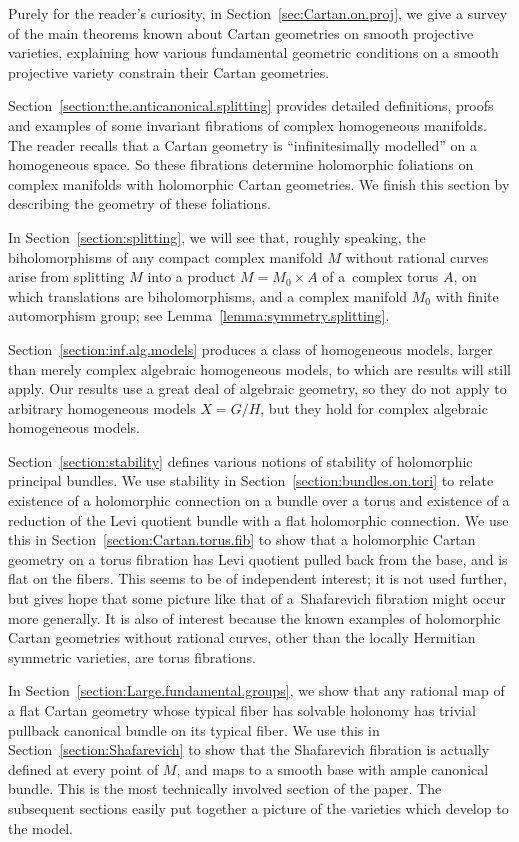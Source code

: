 \documentclass[10pt,a4paper]{amsart}
\numberwithin{equation}{section}
\begin{document}
Purely for the reader's curiosity, in Section~\ref{sec:Cartan.on.proj}, we give a survey of the main theorems known about Cartan
geometries on smooth projective varieties, explaining how various fundamental geometric conditions on a smooth projective variety
constrain their Cartan geometries.

Section~\ref{section:the.anticanonical.splitting} provides detailed definitions, proofs and examples of some invariant fibrations of complex homogeneous manifolds.
The reader recalls that a Cartan geometry is ``infinitesimally modelled'' on a homogeneous space.
So these fibrations determine holomorphic foliations on complex manifolds with holomorphic Cartan geometries.
We finish this section by describing the geometry of these foliations.

In Section~\ref{section:splitting}, we will see that, roughly speaking, the biholomorphisms of any compact complex manifold $M$ without rational curves arise from splitting $M$
into a product $M = M_0\times A$ of a~complex torus $A$, on which translations are biholomorphisms, and a complex manifold $M_0$ with
finite automorphism group; see Lemma~\ref{lemma:symmetry.splitting}.

Section~\ref{section:inf.alg.models} produces a class of homogeneous models, larger than merely complex algebraic homogeneous models, to which are results will still apply.
Our results use a great deal of algebraic geometry, so they do not apply to arbitrary homogeneous models $X = G/H$, but they hold for complex algebraic homogeneous models.

Section~\ref{section:stability} defines various notions of stability of holomorphic principal bundles.
We use stability in Section~\ref{section:bundles.on.tori} to relate existence of a holomorphic connection on a bundle over a torus and existence of a reduction of the Levi quotient bundle with a flat holomorphic connection.
We use this in Section~\ref{section:Cartan.torus.fib} to show that a holomorphic Cartan geometry on a torus fibration has Levi quotient pulled back from the base, and is flat on the fibers.
This seems to be of independent interest; it is not used further, but gives hope that some picture like that of a~Shafarevich fibration might occur more generally.
It is also of interest because the known examples of holomorphic Cartan geometries without rational curves, other than the locally Hermitian symmetric varieties, are torus fibrations.

In Section~\ref{section:Large.fundamental.groups}, we show that any rational map of a flat Cartan geometry whose typical fiber has solvable holonomy has trivial pullback canonical bundle on its typical fiber.
We use this in Section~\ref{section:Shafarevich} to show that the Shafarevich fibration is actually defined at every point of $M$, and maps to a smooth base with ample canonical bundle.
This is the most technically involved section of the paper.
The subsequent sections easily put together a picture of the varieties which develop to the model.
\end{document}
